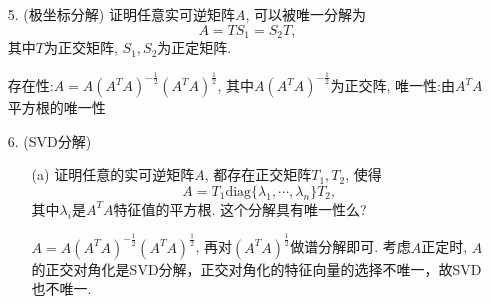 \begin{itemize}
\begin{solution}
	\end{solution}
	\vspace{2cm}

	\item[5.] (极坐标分解) 证明任意实可逆矩阵$A$, 可以被唯一分解为$$A = TS_1 = S_2 T,$$
	其中$T$为正交矩阵, $S_1, S_2$为正定矩阵.
	\begin{solution}
		存在性:$A = A(A^TA)^{-\frac{1}{2}}(A^TA)^{\frac{1}{2}}$, 其中$A(A^TA)^{-\frac{1}{2}}$为正交阵,
		唯一性:由$A^TA$平方根的唯一性
	\end{solution}
	\vspace{2cm}

	\item[6.] (SVD分解) 
	\begin{itemize}
		\item [(a)] 证明任意的实可逆矩阵$A$, 都存在正交矩阵$T_1,T_2$, 使得
		$$A = T_1 \mathrm{diag}\{\lambda_1, \cdots, \lambda_n\} T_2,$$
		其中$\lambda_i$是$A^TA$特征值的平方根. 这个分解具有唯一性么?
		\begin{solution}
		$A = A(A^TA)^{-\frac{1}{2}}(A^TA)^{\frac{1}{2}}$, 再对$(A^TA)^{\frac{1}{2}}$做谱分解即可.
		考虑$A$正定时, $A$的正交对角化是SVD分解，正交对角化的特征向量的选择不唯一，故SVD也不唯一.
		\end{solution}
		\vspace{2cm}


\end{itemize}
\end{itemize}
